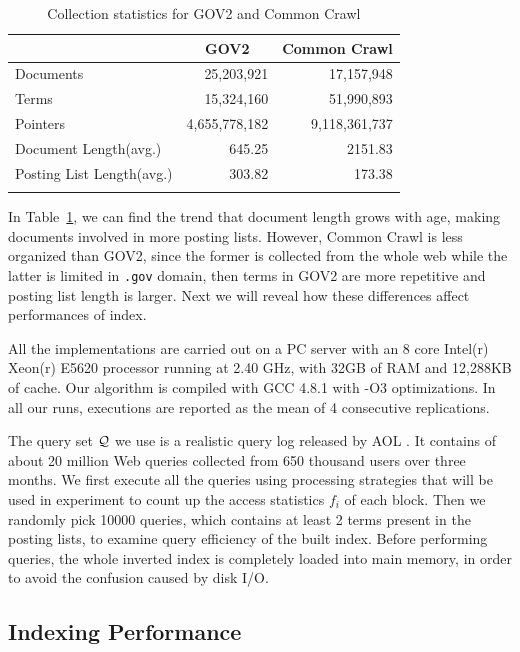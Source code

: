 \documentclass{sig-alternate-05-2015}
\begin{document}
\begin{table}
	\centering
	\caption{Collection statistics for GOV2 and Common Crawl}
	\renewcommand{\arraystretch}{1.0}
	\setlength\tabcolsep{3pt}
	\begin{tabular}{l*{2}{r}}
		\toprule
		& \multicolumn{1}{c}{GOV2} & \multicolumn{1}{c}{Common Crawl} \\
		\midrule
		Documents & 25,203,921 & 17,157,948 \\
		Terms & 15,324,160 & 51,990,893 \\
		Pointers & 4,655,778,182 & 9,118,361,737 \\
		Document Length(avg.) & 645.25 & 2151.83 \\
		Posting List Length(avg.) & 303.82 & 173.38 \\
		\bottomrule
		\label{tab: collection statistics}
	\end{tabular}
\end{table}

In Table~\ref{tab: collection statistics}, we can find the trend that document length grows with age, making documents involved in more posting lists.
However, Common Crawl is less organized than GOV2, since the former is collected from the whole web while the latter is limited in \texttt{.gov} domain, then terms in GOV2 are more repetitive and posting list length is larger.
Next we will reveal how these differences affect performances of index.

All the implementations are carried out on a PC server with an 8 core Intel(r) Xeon(r) E5620 processor running at 2.40 GHz, with 32GB of RAM and 12,288KB of cache. Our algorithm is compiled with GCC 4.8.1 with -O3 optimizations. In all our runs, executions are reported as the mean of 4 consecutive replications.

The query set $ \cal Q $ we use is a realistic query log released by AOL \cite{pass2006picture}.
It contains of about 20 million Web queries collected from 650 thousand users over three months.
We first execute all the queries using processing strategies that will be used in experiment to count up the access statistics $ f_i $ of each block.
Then we randomly pick 10000 queries, which contains at least 2 terms present in the posting lists, to examine query efficiency of the built index.
Before performing queries, the whole inverted index is completely loaded into main memory, in order to avoid the confusion caused by disk I/O.

\subsection{Indexing Performance}
\end{document}
